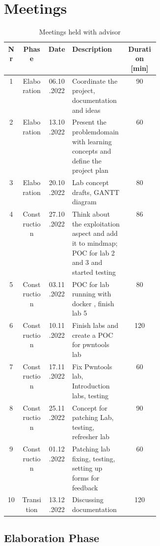 \chapter*{Meetings}
\label{meeting_chapter}

\begin{table}[H]
    \centering
    \begin{tabular}{| c | c | c | p{0.36\linewidth} | c |}
        \hline 
        Nr & Phase & Date & Description & Duration [min]\\
        \hline \hline
        1 & Elaboration & 06.10.2022 & Coordinate the project, documentation \- and ideas & 90\\
        \hline
        2 & Elaboration & 13.10.2022 & Present the problemdomain with learning concepts and define the project plan & 60 \\
        \hline
        3 & Elaboration & 20.10.2022 & Lab concept drafts, GANTT diagram & 80 \\
        \hline
        4 & Construction & 27.10.2022 & Think about the exploitation aspect and add it to mindmap; POC for lab 2 and 3 and started testing & 86\\
        \hline
        5 & Construction & 03.11.2022 & POC for lab running with docker , finish lab 5 & 80 \\
        \hline
        6 & Construction & 10.11.2022 & Finish labs and create a POC for pwntools lab & 120 \\
        \hline
        7 & Construction & 17.11.2022 & Fix Pwntools lab, Introduction labs, testing & 60 \\
        \hline
        8 & Construction & 25.11.2022 & Concept for patching Lab, testing, refresher lab & 90 \\
        \hline
        9 & Construction & 01.12.2022 & Patching lab fixing, testing, setting up forms for feedback & 60 \\
        \hline
        10 & Transition & 13.12.2022 & Discussing documentation & 120 \\
        \hline
    \end{tabular}
    \caption{Meetings held with advisor}
    \label{meetings_hold_table}
\end{table}

\newpage
\section*{Elaboration Phase}
